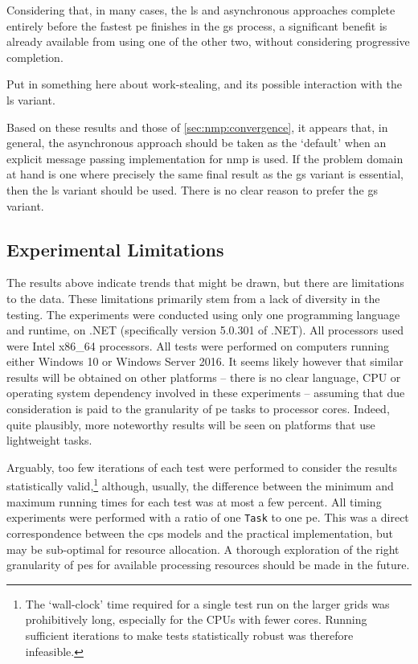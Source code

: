 Considering that, in many cases, the \gls{ls} and asynchronous approaches complete entirely before the fastest \gls{pe} finishes in the \gls{gs} process, a significant benefit is already available from using one of the other two, without considering progressive completion.

\begin{anfxnote}
Put in something here about work-stealing, and its possible interaction with the \gls{ls} variant.
\end{anfxnote}

Based on these results and those of \autoref{sec:nmp:convergence}, it appears that, in general, the asynchronous approach should be taken as the `default' when an explicit message passing implementation for \gls{nmp} is used.  If the problem domain at hand is one where precisely the same final result as the \gls{gs} variant is essential, then the \gls{ls} variant should be used.  There is no clear reason to prefer the \gls{gs} variant.

\subsection{Experimental Limitations}
The results above indicate trends that might be drawn, but there are limitations to the data.  These limitations primarily stem from a lack of diversity in the testing.  The experiments were conducted using only one programming language and runtime, \csharp{} on .NET (specifically version 5.0.301 of .NET).  All processors used were Intel x86\_64 processors.  All tests were performed on computers running either Windows 10 or Windows Server 2016.  It seems likely however that similar results will be obtained on other platforms -- there is no clear language, CPU or operating system dependency involved in these experiments -- assuming that due consideration is paid to the granularity of \gls{pe} tasks to processor cores.  Indeed, quite plausibly, more noteworthy results will be seen on platforms that use lightweight tasks.

Arguably, too few iterations of each test were performed to consider the results statistically valid,\footnote{The `wall-clock' time required for a single test run on the larger grids was prohibitively long, especially for the CPUs with fewer cores.  Running sufficient iterations to make tests statistically robust was therefore infeasible.} although, usually, the difference between the minimum and maximum running times for each test was at most a few percent.  All timing experiments were performed with a ratio of one \texttt{Task} to one \gls{pe}.  This was a direct correspondence between the \gls{cps} models and the practical implementation, but may be sub-optimal for resource allocation.  A thorough exploration of the right granularity of \glspl{pe} for available processing resources should be made in the future.

